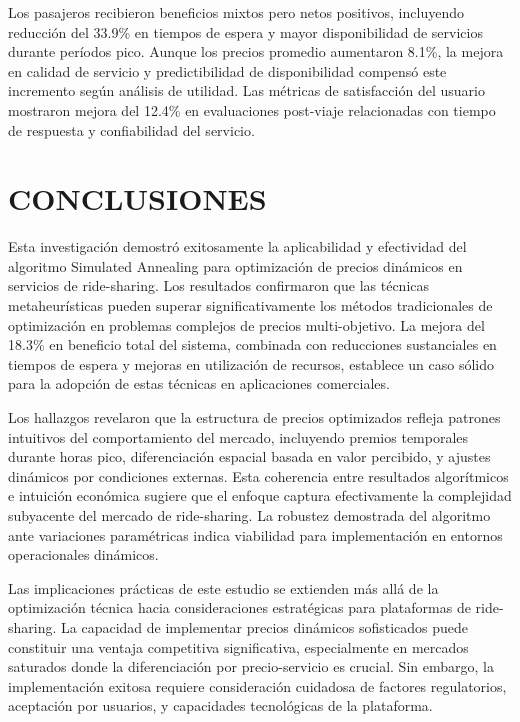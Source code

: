\documentclass[12pt,a4paper,twocolumn]{article}
\begin{document}
Los pasajeros recibieron beneficios mixtos pero netos positivos, incluyendo reducción del 33.9\% en tiempos de espera y mayor disponibilidad de servicios durante períodos pico. Aunque los precios promedio aumentaron 8.1\%, la mejora en calidad de servicio y predictibilidad de disponibilidad compensó este incremento según análisis de utilidad. Las métricas de satisfacción del usuario mostraron mejora del 12.4\% en evaluaciones post-viaje relacionadas con tiempo de respuesta y confiabilidad del servicio.

\section{CONCLUSIONES}

Esta investigación demostró exitosamente la aplicabilidad y efectividad del algoritmo Simulated Annealing para optimización de precios dinámicos en servicios de ride-sharing. Los resultados confirmaron que las técnicas metaheurísticas pueden superar significativamente los métodos tradicionales de optimización en problemas complejos de precios multi-objetivo. La mejora del 18.3\% en beneficio total del sistema, combinada con reducciones sustanciales en tiempos de espera y mejoras en utilización de recursos, establece un caso sólido para la adopción de estas técnicas en aplicaciones comerciales.

Los hallazgos revelaron que la estructura de precios optimizados refleja patrones intuitivos del comportamiento del mercado, incluyendo premios temporales durante horas pico, diferenciación espacial basada en valor percibido, y ajustes dinámicos por condiciones externas. Esta coherencia entre resultados algorítmicos e intuición económica sugiere que el enfoque captura efectivamente la complejidad subyacente del mercado de ride-sharing. La robustez demostrada del algoritmo ante variaciones paramétricas indica viabilidad para implementación en entornos operacionales dinámicos.

Las implicaciones prácticas de este estudio se extienden más allá de la optimización técnica hacia consideraciones estratégicas para plataformas de ride-sharing. La capacidad de implementar precios dinámicos sofisticados puede constituir una ventaja competitiva significativa, especialmente en mercados saturados donde la diferenciación por precio-servicio es crucial. Sin embargo, la implementación exitosa requiere consideración cuidadosa de factores regulatorios, aceptación por usuarios, y capacidades tecnológicas de la plataforma.
\end{document}
